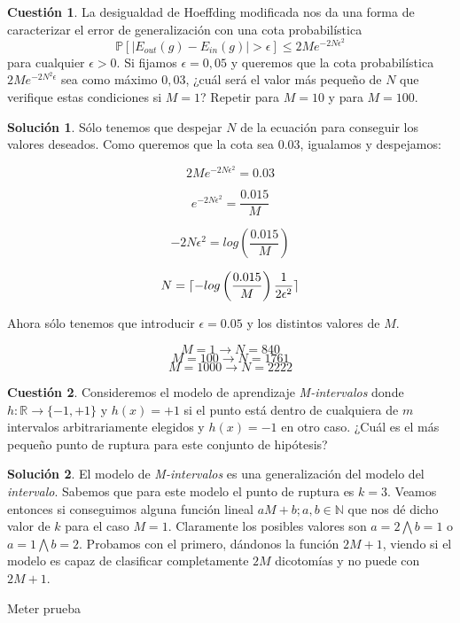 \documentclass[a4paper, 11pt]{article}
\theoremstyle{definition}
\newtheorem{cuestion}{Cuestión}
\newtheorem*{solucion}{Solución}
\DeclarePairedDelimiter{\ceil}{\lceil}{\rceil}
\begin{document}
  \begin{cuestion}
  La desigualdad de Hoeffding modificada nos da una forma de caracterizar el error de generalización con una cota probabilística
  \[
  \mathds{P}[|E_{out}(g) - E_{in}(g)| > \epsilon] \leq 2Me^{-2N \epsilon^2}
  \]
  para cualquier $\epsilon > 0$. Si fijamos $\epsilon=0,05$ y queremos que la cota probabilística $2Me^{-2N^2 \epsilon}$ sea como máximo $0,03$, ¿cuál será el valor más pequeño de $N$ que verifique estas condiciones si $M=1$? Repetir para $M=10$ y para $M=100$.

  \end{cuestion}

  \begin{solucion}
    Sólo tenemos que despejar $N$ de la ecuación para conseguir los valores deseados. Como queremos que la cota sea $0.03$, igualamos y despejamos:

      \[
      2Me^{-2N\epsilon^2} = 0.03
      \]

      \[
      e^{-2N\epsilon^2} = \frac{0.015}{M}
      \]

      \[
      -2N\epsilon^2 = log\left(\frac{0.015}{M}\right)
      \]

      \[
      N = \ceil{-log\left(\frac{0.015}{M}\right) \frac{1}{2\epsilon^2}}
      \]

      Ahora sólo tenemos que introducir $\epsilon = 0.05$ y los distintos valores de $M$.

      $$M =  1 \rightarrow N =  840$$
      $$M =  100 \rightarrow N =  1761$$
      $$M =  1000 \rightarrow N =  2222$$

  \end{solucion}

  \begin{cuestion}
  Consideremos el modelo de aprendizaje \emph{M-intervalos} donde $h: \mathbb{R} \rightarrow \{-1, +1\}$ y $h(x)=+1$ si el punto está dentro de cualquiera de $m$ intervalos arbitrariamente elegidos y $h(x)=-1$ en otro caso. ¿Cuál es el más pequeño punto de ruptura para este conjunto de hipótesis?

  \end{cuestion}

  \begin{solucion}
    El modelo de \emph{M-intervalos} es una generalización del modelo del \emph{intervalo}. Sabemos que para este modelo el punto de ruptura es $k = 3$. Veamos entonces si conseguimos alguna función lineal $aM + b; a,b \in \mathbb{N}$ que nos dé dicho valor de $k$ para el caso $M = 1$. Claramente los posibles valores son $a = 2 \bigwedge b = 1$ o $a = 1 \bigwedge b = 2$. Probamos con el primero, dándonos la función $2M+1$, viendo si el modelo es capaz de clasificar completamente $2M$ dicotomías y no puede con $2M+1$.

    Meter prueba
  \end{solucion}
\end{document}
